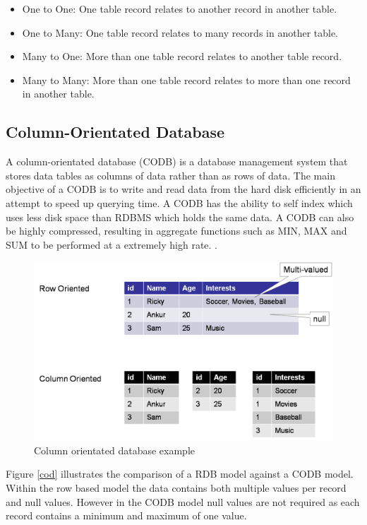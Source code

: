 \begin{itemize}
\item One to One: One table record relates to another record in another table.
\item One to Many: One table record relates to many records in another table.
\item Many to One: More than one table record relates to another table record.
\item Many to Many: More than one table record relates to more than one record in another table.
\end{itemize}


\subsection{Column-Orientated Database}
A column-orientated database (CODB) is a database management system that stores data tables as columns of data rather than as rows of data. The main objective of a CODB is to write and read data from the hard disk efficiently in an attempt to speed up querying time. A CODB has the ability to self index which uses less disk space than RDBMS which holds the same data. A CODB can also be highly compressed, resulting in aggregate functions such as MIN, MAX and SUM to be performed at a extremely high rate.  \cite{cd}.

\begin{figure}[h]\begin{center}\includegraphics[width=1\linewidth]{images/codb}\caption{Column orientated database example}\label{fig:cod}\end{center}\end{figure}

Figure \ref{cod} illustrates the comparison of a RDB model against a CODB model. Within the row based model the data contains both multiple values per record and null values. However in the CODB model null values are not required as each record contains a minimum and maximum of one value.

